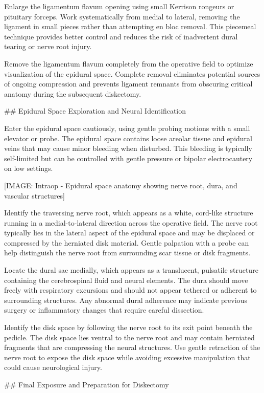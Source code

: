 \documentclass[12pt,a4paper]{article}
\begin{document}
Enlarge the ligamentum flavum opening using small Kerrison rongeurs or pituitary forceps. Work systematically from medial to lateral, removing the ligament in small pieces rather than attempting en bloc removal. This piecemeal technique provides better control and reduces the risk of inadvertent dural tearing or nerve root injury.

Remove the ligamentum flavum completely from the operative field to optimize visualization of the epidural space. Complete removal eliminates potential sources of ongoing compression and prevents ligament remnants from obscuring critical anatomy during the subsequent diskectomy.

\#\# Epidural Space Exploration and Neural Identification

Enter the epidural space cautiously, using gentle probing motions with a small elevator or probe. The epidural space contains loose areolar tissue and epidural veins that may cause minor bleeding when disturbed. This bleeding is typically self-limited but can be controlled with gentle pressure or bipolar electrocautery on low settings.

[IMAGE: Intraop - Epidural space anatomy showing nerve root, dura, and vascular structures]

Identify the traversing nerve root, which appears as a white, cord-like structure running in a medial-to-lateral direction across the operative field. The nerve root typically lies in the lateral aspect of the epidural space and may be displaced or compressed by the herniated disk material. Gentle palpation with a probe can help distinguish the nerve root from surrounding scar tissue or disk fragments.

Locate the dural sac medially, which appears as a translucent, pulsatile structure containing the cerebrospinal fluid and neural elements. The dura should move freely with respiratory excursions and should not appear tethered or adherent to surrounding structures. Any abnormal dural adherence may indicate previous surgery or inflammatory changes that require careful dissection.

Identify the disk space by following the nerve root to its exit point beneath the pedicle. The disk space lies ventral to the nerve root and may contain herniated fragments that are compressing the neural structures. Use gentle retraction of the nerve root to expose the disk space while avoiding excessive manipulation that could cause neurological injury.

\#\# Final Exposure and Preparation for Diskectomy
\end{document}
